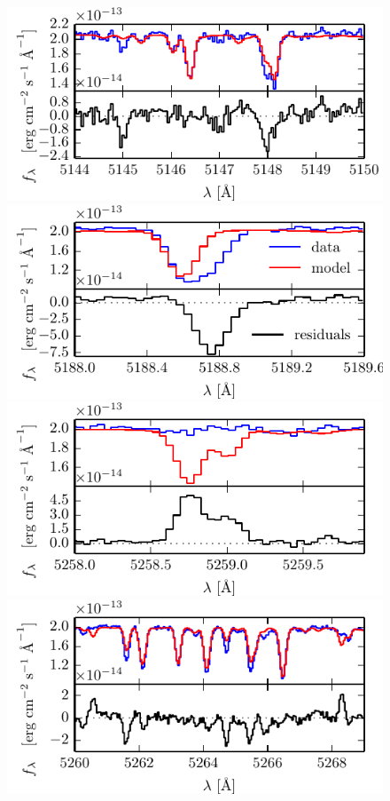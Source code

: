 \documentclass[iop,floatfix]{emulateapj}
\begin{document}
\begin{figure}[!htb]
\begin{center}
  \includegraphics{figs/badlines0.pdf}
  \includegraphics{figs/badlines1.pdf}
  \includegraphics{figs/badlines2.pdf}
  \includegraphics{figs/badlines3.pdf}

\end{center}
\end{figure}
\end{document}
